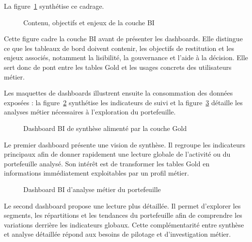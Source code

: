 La figure~\ref{fig:realisation-bi-objectifs-enjeux} synthétise ce cadrage.

\begin{figure}[H]
\centering
{}
\caption{Contenu, objectifs et enjeux de la couche BI}
\label{fig:realisation-bi-objectifs-enjeux}
\end{figure}

Cette figure cadre la couche BI avant de présenter les dashboards. Elle distingue ce que les tableaux de bord doivent contenir, les objectifs de restitution et les enjeux associés, notamment la lisibilité, la gouvernance et l'aide à la décision. Elle sert donc de pont entre les tables Gold et les usages concrets des utilisateurs métier.

Les maquettes de dashboards illustrent ensuite la consommation des données exposées : la figure~\ref{fig:realisation-dashboard-bi-1} synthétise les indicateurs de suivi et la figure~\ref{fig:realisation-dashboard-bi-2} détaille les analyses métier nécessaires à l'exploration du portefeuille.

\begin{figure}[H]
\centering
{}
\caption{Dashboard BI de synthèse alimenté par la couche Gold}
\label{fig:realisation-dashboard-bi-1}
\end{figure}

Le premier dashboard présente une vision de synthèse. Il regroupe les indicateurs principaux afin de donner rapidement une lecture globale de l'activité ou du portefeuille analysé. Son intérêt est de transformer les tables Gold en informations immédiatement exploitables par un profil métier.

\begin{figure}[H]
\centering
{}
\caption{Dashboard BI d'analyse métier du portefeuille}
\label{fig:realisation-dashboard-bi-2}
\end{figure}

Le second dashboard propose une lecture plus détaillée. Il permet d'explorer les segments, les répartitions et les tendances du portefeuille afin de comprendre les variations derrière les indicateurs globaux. Cette complémentarité entre synthèse et analyse détaillée répond aux besoins de pilotage et d'investigation métier.

